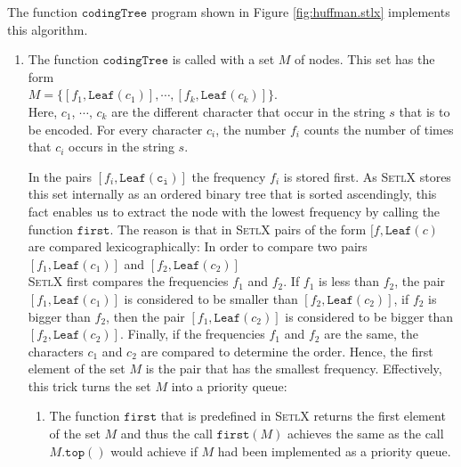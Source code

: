\noindent
The function $\mathtt{codingTree}$ program shown in Figure \ref{fig:huffman.stlx} implements this algorithm.
\begin{enumerate}
\item The function $\mathtt{codingTree}$ is called with a set  $M$ of nodes.  This set has the form
      \\[0.2cm]
      \hspace*{1.3cm}
      $M = \bigl\{ [ f_1, \mathtt{Leaf}(c_1) ], \cdots, [f_k, \mathtt{Leaf}(c_k)] \bigr\}$.
      \\[0.2cm]
      Here, $c_1$, $\cdots$, $c_k$ are the different character that occur in the string $s$ that is to be encoded. 
      For every character $c_i$, the number $f_i$ counts the number of times that $c_i$ occurs in the string $s$.

      In the pairs $[f_i, \mathtt{Leaf(c_i)}]$ the frequency $f_i$ is stored first.
      As \textsc{SetlX} stores this set internally as an ordered binary tree that is sorted ascendingly, this
      fact enables us to extract the node with the lowest frequency by calling the function $\mathtt{first}$.
      The reason is that in \textsc{SetlX} pairs of the form $[f, \mathtt{Leaf}(c)$ are compared
      lexicographically:  In order to compare two pairs
      \\[0.2cm]
      \hspace*{1.3cm}
      $[f_1, \mathtt{Leaf}(c_1)]$ \quad and \quad $[f_2, \mathtt{Leaf}(c_2)]$
      \\[0.2cm]
      \textsc{SetlX} first compares the frequencies $f_1$ and $f_2$.  If $f_1$ is less than $f_2$, the pair
      $[f_1, \mathtt{Leaf}(c_1)]$ is considered to be smaller than $[f_2, \mathtt{Leaf}(c_2)]$, if $f_2$ is bigger
      than $f_2$, then the pair $[f_1, \mathtt{Leaf}(c_2)]$ is considered to be bigger than
      $[f_2,
      \mathtt{Leaf}(c_2)]$.  Finally, if the frequencies $f_1$ and $f_2$ are the same, the characters $c_1$ and
      $c_2$ are compared to determine the order.  Hence, the first element of the set $M$ is the pair that has
      the smallest frequency.  Effectively, this trick turns the set $M$ into a priority queue:
      \begin{enumerate}
      \item The function $\mathtt{first}$ that is predefined in \textsc{SetlX} returns the first element of the
            set $M$ and thus the call $\mathtt{first}(M)$ achieves the same as the call $M.\mathtt{top}()$
            would achieve if $M$ had been implemented as a priority queue.

\end{enumerate}
\end{enumerate}
